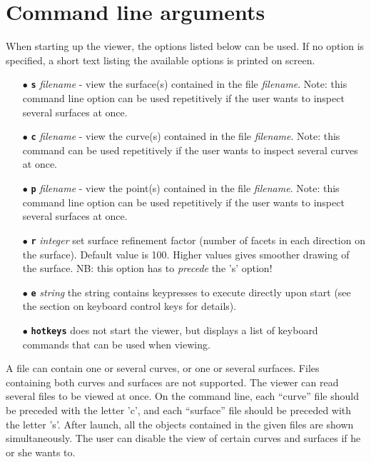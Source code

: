 \section{Command line arguments}
When starting up the viewer, the options listed below can be used.  If no option is
specified, a short text listing the available options is printed on screen.

\begin{itemize}
\item[$\bullet$] \textbf{\protect \Verb/s/} \textit{filename} - view the surface(s) contained in
the file \textit{filename}.  Note: this command line option can be used repetitively if
the user wants to inspect several surfaces at once.
\item[$\bullet$] \textbf{\protect \Verb/c/} \textit{filename} - view the curve(s) contained in the
file \textit{filename}.  Note: this command can be used repetitively if the user wants
to inspect several curves at once.
\item[$\bullet$] \textbf{\protect \Verb/p/} \textit{filename} - view the point(s) contained in 
the file \textit{filename}.  Note: this command line option can be used repetitively if
the user wants to inspect several surfaces at once.
\item[$\bullet$] \textbf{\protect \Verb/r/} \textit{integer} set surface refinement factor 
(number of facets in each direction on the surface). Default value is 100.  Higher values
gives smoother drawing of the surface.  NB: this option has to \emph{precede} the 's' 
option!
\item[$\bullet$] \textbf{\protect \Verb/e/} \textit{string} the string contains keypresses to execute
directly upon start (see the section on keyboard control keys for details).
\item[$\bullet$] \textbf{\protect \Verb/hotkeys/} does not start the viewer, but displays a list 
of keyboard commands that can be used when viewing.
\end{itemize}

A file can contain one or several curves, or one or several surfaces.  Files containing
both curves and surfaces are not supported.  The viewer can read several files to be
viewed at once.  On the command line, each ``curve'' file should be preceded with the
letter 'c', and each ``surface'' file should be preceded with the letter 's'.  After 
launch, all the objects contained in the given files are shown simultaneously.  The user
can disable the view of certain curves and surfaces if he or she wants to.  

